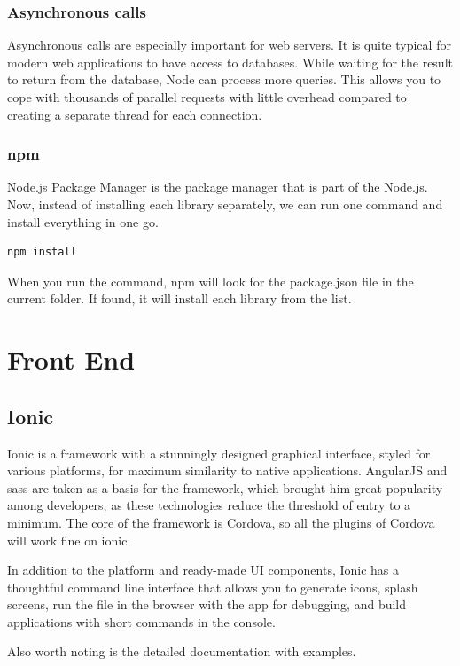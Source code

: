\subsubsection{Asynchronous calls}
Asynchronous calls are especially important for web servers. It is quite typical for modern web applications to have access to databases. While waiting for the result to return from the database, Node can process more queries. This allows you to cope with thousands of parallel requests with little overhead compared to creating a separate thread for each connection. \cite{NodeJS}

\subsubsection{npm}
Node.js Package Manager is the package manager that is part of the Node.js.
Now, instead of installing each library separately, we can run one command and install everything in one go.

\begin{verbatim}
npm install
\end{verbatim}

When you run the command, npm will look for the package.json file in the current folder. If found, it will install each library from the list. \cite{NodeJS}

\section{Front End}

\subsection{Ionic}
Ionic is a framework with a stunningly designed graphical interface, styled for various platforms, for maximum similarity to native applications. AngularJS and sass are taken as a basis for the framework, which brought him great popularity among developers, as these technologies reduce the threshold of entry to a minimum. The core of the framework is Cordova, so all the plugins of Cordova will work fine on ionic.\par In addition to the platform and ready-made UI components, Ionic has a thoughtful command line interface that allows you to generate icons, splash screens, run the file in the browser with the app for debugging, and build applications with short commands in the console.\par Also worth noting is the detailed documentation with examples.\cite{Ionic}

